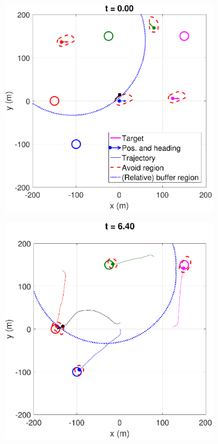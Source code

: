 \begin{figure}
\centering
\begin{subfigure}{.5\columnwidth}
  \centering
  \includegraphics[width=\columnwidth]{figs/simulate_bufferRegion_properties_normal_1}
  \subcaption{}
  \label{fig:normalcase1}
\end{subfigure}%
\begin{subfigure}{.5\columnwidth}
  \centering
  \includegraphics[width=\columnwidth]{figs/simulate_bufferRegion_properties_normal_2}

\end{subfigure}
\end{figure}
